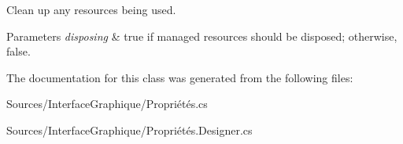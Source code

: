 Clean up any resources being used. 


\begin{DoxyParams}{Parameters}
{\em disposing} & true if managed resources should be disposed; otherwise, false.\\
\hline
\end{DoxyParams}


The documentation for this class was generated from the following files\+:\begin{DoxyCompactItemize}
\item 
Sources/\+Interface\+Graphique/Propriétés.\+cs\item 
Sources/\+Interface\+Graphique/Propriétés.\+Designer.\+cs\end{DoxyCompactItemize}
